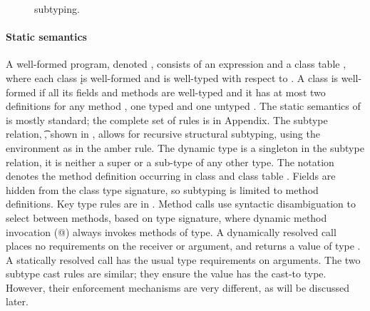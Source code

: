\documentclass[runnningheads]{tex/llncs}
\begin{document}
\begin{figure}[!b] \hrulefill\small

\vspace{-2mm}

\begin{mathpar}

\hspace{-8mm}


\hspace{-8mm}

\end{mathpar}

\hrulefill\caption{\kafka subtyping.}\label{sub}%
\end{figure}


\paragraph{Static semantics} A well-formed program, denoted \WFp\e\K, consists
of an expression \e and a class table \K, where each class \k is well-formed
and \e is well-typed with respect to \K.  A class is well-formed if all its
fields and methods are well-typed and it has at most two definitions for any
method \m, one typed \Mdef\m\x\C\D\e and one untyped \Mdef\m\x\any\any\e.  The
static semantics of \kafka is mostly standard; the complete set of rules is in
Appendix.  The subtype relation, \StrSub\M\K\t\tp, shown in
, allows for recursive structural subtyping, using the environment
\M as in the amber rule.  The dynamic type \any is a singleton in the subtype
relation, it is neither a super or a sub-type of any other type.  The notation
\md\In\App\K\C denotes the method definition \md occurring in class \C and
class table \K.  Fields are hidden from the class type signature, so
subtyping is limited to method definitions.  Key type rules are in
.  Method calls use syntactic disambiguation to select
between methods, based on type signature, where dynamic method invocation (@)
always invokes methods of type\any. A dynamically resolved call places no
requirements on the receiver or argument, and returns a value of type \any.  A
statically resolved call has the usual type requirements on arguments. The two
subtype cast rules are similar; they ensure the value has the cast-to type.
However, their enforcement mechanisms are very different, as will be discussed
later.
\end{document}
